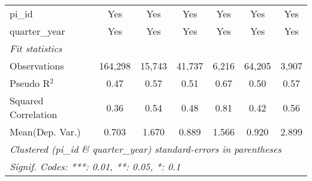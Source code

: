 \begin{tabular}{lcccccc}
   pi\_id                                                     & Yes          & Yes           & Yes           & Yes           & Yes           & Yes\\  
   quarter\_year                                              & Yes          & Yes           & Yes           & Yes           & Yes           & Yes\\  
   \midrule
   \emph{Fit statistics}\\
   Observations                                               & 164,298      & 15,743        & 41,737        & 6,216         & 64,205        & 3,907\\  
   Pseudo R$^2$                                               & 0.47         & 0.57          & 0.51          & 0.67          & 0.50          & 0.57\\  
   Squared Correlation                                        & 0.36         & 0.54          & 0.48          & 0.81          & 0.42          & 0.56\\  
Mean(Dep. Var.) & 0.703 & 1.670 & 0.889 & 1.566 & 0.920 & 2.899 \\
   \midrule \midrule
   \multicolumn{7}{l}{\emph{Clustered (pi\_id \& quarter\_year) standard-errors in parentheses}}\\
   \multicolumn{7}{l}{\emph{Signif. Codes: ***: 0.01, **: 0.05, *: 0.1}}\\
\end{tabular}
\par\endgroup
